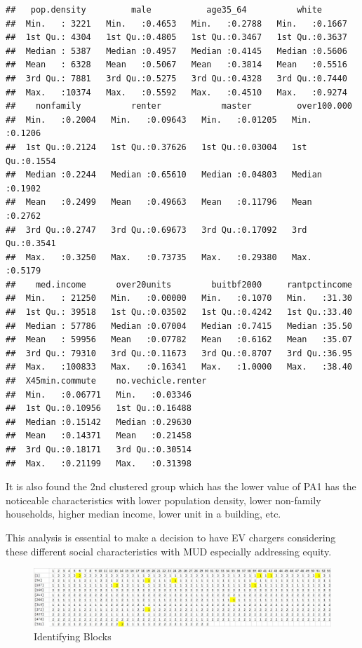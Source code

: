 \documentclass[]{article}
\begin{document}
\begin{verbatim}
##   pop.density         male           age35_64          white       
##  Min.   : 3221   Min.   :0.4653   Min.   :0.2788   Min.   :0.1667  
##  1st Qu.: 4304   1st Qu.:0.4805   1st Qu.:0.3467   1st Qu.:0.3637  
##  Median : 5387   Median :0.4957   Median :0.4145   Median :0.5606  
##  Mean   : 6328   Mean   :0.5067   Mean   :0.3814   Mean   :0.5516  
##  3rd Qu.: 7881   3rd Qu.:0.5275   3rd Qu.:0.4328   3rd Qu.:0.7440  
##  Max.   :10374   Max.   :0.5592   Max.   :0.4510   Max.   :0.9274  
##    nonfamily          renter            master         over100.000    
##  Min.   :0.2004   Min.   :0.09643   Min.   :0.01205   Min.   :0.1206  
##  1st Qu.:0.2124   1st Qu.:0.37626   1st Qu.:0.03004   1st Qu.:0.1554  
##  Median :0.2244   Median :0.65610   Median :0.04803   Median :0.1902  
##  Mean   :0.2499   Mean   :0.49663   Mean   :0.11796   Mean   :0.2762  
##  3rd Qu.:0.2747   3rd Qu.:0.69673   3rd Qu.:0.17092   3rd Qu.:0.3541  
##  Max.   :0.3250   Max.   :0.73735   Max.   :0.29380   Max.   :0.5179  
##    med.income      over20units        buitbf2000     rantpctincome  
##  Min.   : 21250   Min.   :0.00000   Min.   :0.1070   Min.   :31.30  
##  1st Qu.: 39518   1st Qu.:0.03502   1st Qu.:0.4242   1st Qu.:33.40  
##  Median : 57786   Median :0.07004   Median :0.7415   Median :35.50  
##  Mean   : 59956   Mean   :0.07782   Mean   :0.6162   Mean   :35.07  
##  3rd Qu.: 79310   3rd Qu.:0.11673   3rd Qu.:0.8707   3rd Qu.:36.95  
##  Max.   :100833   Max.   :0.16341   Max.   :1.0000   Max.   :38.40  
##  X45min.commute    no.vechicle.renter
##  Min.   :0.06771   Min.   :0.03346   
##  1st Qu.:0.10956   1st Qu.:0.16488   
##  Median :0.15142   Median :0.29630   
##  Mean   :0.14371   Mean   :0.21458   
##  3rd Qu.:0.18171   3rd Qu.:0.30514   
##  Max.   :0.21199   Max.   :0.31398
\end{verbatim}

It is also found the 2nd clustered group which has the lower value of
PA1 has the noticeable characteristics with lower population density,
lower non-family households, higher median income, lower unit in a
building, etc.

This analysis is essential to make a decision to have EV chargers
considering these different social characteristics with MUD especially
addressing equity.

\begin{figure}
\centering
\includegraphics{./figs/mud.jpg}
\caption{Identifying Blocks}
\end{figure}
\end{document}
